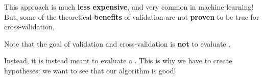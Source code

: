        This approach is much \textbf{less expensive}, and very common in machine learning! But, some of the theoretical \textbf{benefits} of validation are not \textbf{proven} to be true for cross-validation.\\
        
        \begin{clarification}
            Note that the goal of validation and cross-validation is \textbf{not} to evaluate .
            
            Instead, it is instead meant to evaluate a . This is why we have to create  hypotheses: we want to see that our algorithm is  good!
        \end{clarification}